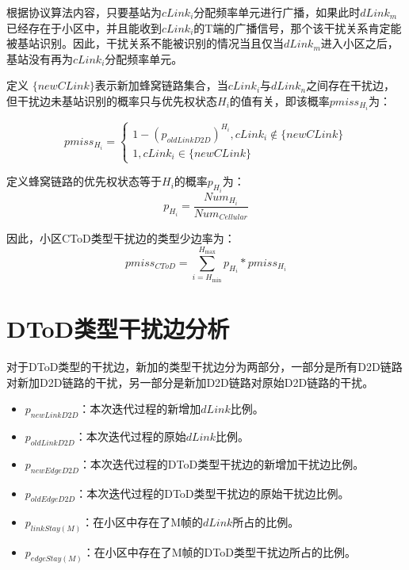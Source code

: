 \documentclass[figurelist,tablelist,algorithmlist,nomlist,masters]{seuthesix}
\begin{document}
	根据协议算法内容，只要基站为$cLink_i$分配频率单元进行广播，如果此时$dLink_m$已经存在于小区中，并且能收到$cLink_i$的T端的广播信号，那个该干扰关系肯定能被基站识别。因此，干扰关系不能被识别的情况当且仅当$dLink_m$进入小区之后，基站没有再为$cLink_i$分配频率单元。
	
	定义 $\{ newCLink\} $表示新加蜂窝链路集合，当$cLink_i$与$dLink_n$之间存在干扰边，但干扰边未基站识别的概率只与优先权状态${H_i}$的值有关，即该概率$pmis{s_{{H_i}}}$为：
	
	\begin{equation}\label{eq3.1}
	pmis{s_{{H_i}}} = \left\{ \begin{array}{l}
	1 - {({p_{oldLinkD2D}})^{{H_i}}},cLink_i \notin \{ newCLink\} \\
	1,cLink_i \in \{ newCLink\} 
	\end{array} \right.
	\end{equation}
	
	定义蜂窝链路的优先权状态等于${H_i}$的概率${p_{{H_i}}}$为：
	\begin{equation}\label{eq3.1}
	{p_{{H_i}}} = \frac{{Nu{m_{{H_i}}}}}{{Nu{m_{Cellular}}}}
	\end{equation}
	
	因此，小区CToD类型干扰边的类型少边率为：
	\begin{equation}\label{eq3.1}
	pmis{s_{CToD}} = \sum\limits_{i = {H_{\min }}}^{{H_{\max }}} {{p_{{H_i}}}*pmis{s_{{H_i}}}}
	\end{equation}
	
	
	\section{DToD类型干扰边分析}
	对于DToD类型的干扰边，新加的类型干扰边分为两部分，一部分是所有D2D链路对新加D2D链路的干扰，另一部分是新加D2D链路对原始D2D链路的干扰。
	\begin{itemize}
		\item ${p_{newLinkD2D}}$：本次迭代过程的新增加$dLink$比例。
		\item ${p_{oldLinkD2D}}$：本次迭代过程的原始$dLink$比例。
		\item ${p_{newEdgeD2D}}$：本次迭代过程的DToD类型干扰边的新增加干扰边比例。
		\item ${p_{oldEdgeD2D}}$：本次迭代过程的DToD类型干扰边的原始干扰边比例。
		\item ${p_{linkStay(M)}}$：在小区中存在了M帧的$dLink$所占的比例。
		\item ${p_{edgeStay(M)}}$：在小区中存在了M帧的DToD类型干扰边所占的比例。
	\end{itemize}
	
\end{document}
